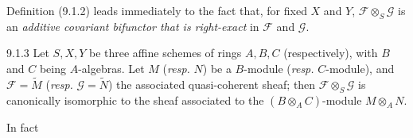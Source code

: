 \documentclass[../main.tex]{subfiles}
\begin{document}
Definition (9.1.2) leads immediately to the fact that, for fixed $X$ and $Y$, $\mathscr{F}\otimes_S\mathscr{G}$ is an \emph{additive covariant bifunctor that is right-exact} in $\mathscr{F}$ and $\mathscr{G}$.

\begin{cx}[Proposition]{9.1.3}
    Let $S,X,Y$ be three affine schemes of rings $A,B,C$ (respectively), with $B$ and $C$ being $A$-algebras.
    Let $M$ (\emph{resp.} $N$) be a $B$-module (\emph{resp.} $C$-module), and $\mathscr{F}=\widetilde{M}$ (\emph{resp.} $\mathscr{G}=\widetilde{N}$) the associated quasi-coherent sheaf; then $\mathscr{F}\otimes_S\mathscr{G}$ is canonically isomorphic to the sheaf associated to the $(B\otimes_A C)$-module $M\otimes_A N$.
\end{cx}

In fact

\end{document}
